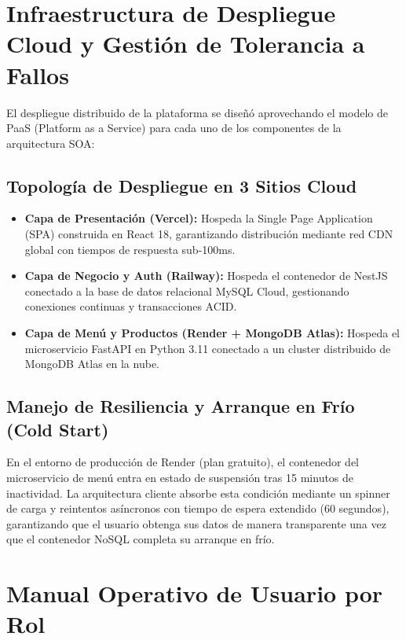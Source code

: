\documentclass[12pt,a4paper]{article}
\begin{document}
\section{Infraestructura de Despliegue Cloud y Gestión de Tolerancia a Fallos}

El despliegue distribuido de la plataforma se diseñó aprovechando el modelo de PaaS (Platform as a Service) para cada uno de los componentes de la arquitectura SOA:

\subsection{Topología de Despliegue en 3 Sitios Cloud}
\begin{itemize}[leftmargin=*]
  \item \textbf{Capa de Presentación (Vercel):} Hospeda la Single Page Application (SPA) construida en React 18, garantizando distribución mediante red CDN global con tiempos de respuesta sub-100ms.
  \item \textbf{Capa de Negocio y Auth (Railway):} Hospeda el contenedor de NestJS conectado a la base de datos relacional MySQL Cloud, gestionando conexiones continuas y transacciones ACID.
  \item \textbf{Capa de Menú y Productos (Render + MongoDB Atlas):} Hospeda el microservicio FastAPI en Python 3.11 conectado a un cluster distribuido de MongoDB Atlas en la nube.
\end{itemize}

\subsection{Manejo de Resiliencia y Arranque en Frío (Cold Start)}
En el entorno de producción de Render (plan gratuito), el contenedor del microservicio de menú entra en estado de suspensión tras 15 minutos de inactividad. La arquitectura cliente absorbe esta condición mediante un spinner de carga y reintentos asíncronos con tiempo de espera extendido (60 segundos), garantizando que el usuario obtenga sus datos de manera transparente una vez que el contenedor NoSQL completa su arranque en frío.

\section{Manual Operativo de Usuario por Rol}
\end{document}
